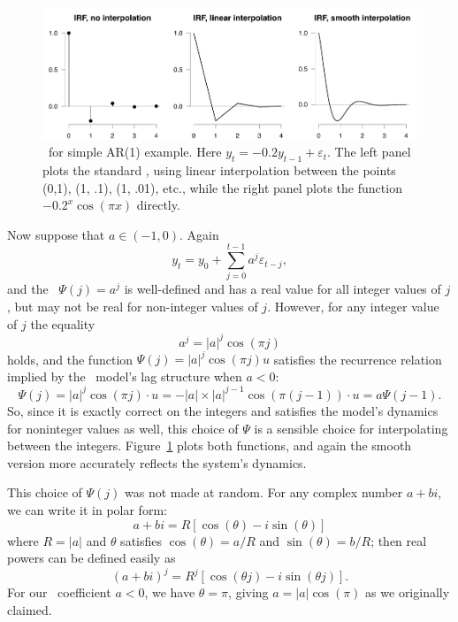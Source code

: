 \documentclass[12pt,fleqn]{article}
\newcommand{\vep}{\varepsilon}
\newcommand{\AR}{\allcaps{AR}}
\begin{document}
\begin{figure}[t]
  \centering
  \includegraphics{graphs/motivation2.pdf}
  \caption{\IRF\ for simple AR(1) example. Here $y_t = -0.2 y_{t-1} +
    \vep_t$. The left panel plots the standard \IRF, using linear
    interpolation between the points (0,1), (1, .1), (1, .01), etc.,
    while the right panel plots the function $- 0.2^x \cos(\pi x)$ directly.}
  \label{f0b}
\end{figure}

Now suppose that $a \in (-1, 0)$. Again
\begin{equation}
  \label{eq:4}
    y_t = y_0 + \sum_{j=0}^{t-1} a^j \vep_{t-j},
\end{equation}
and the \IRF\ $\Psi(j) = a^j$ is well-defined and has a real value for
all integer values of $j$, but may not be real for non-integer values
of $j$. However, for any integer value of $j$ the equality
\begin{equation}
  \label{eq:5}
  a^j = |a|^j \cos(\pi j)
\end{equation}
holds, and the function $\Psi(j) = |a|^j \cos(\pi j) u$ satisfies the
recurrence relation implied by the \AR\ model's lag structure when $a < 0$:
\begin{equation*}
  \Psi(j) = |a|^j \cos(\pi j) \cdot u = - |a| \times |a|^{j-1} \cos(\pi (j-1)) \cdot u = a \Psi(j-1).
\end{equation*}
So, since it is exactly correct on the integers and satisfies the
model's dynamics for noninteger values as well, this choice of $\Psi$
is a sensible choice for interpolating between the
integers. Figure~\ref{f0b} plots both functions, and again the smooth
version more accurately reflects the system's dynamics.

This choice of $\Psi(j)$ was not made at random. For any complex
number $a + bi$, we can write it in polar form:
\[
a + bi = R [\cos(\theta) - i \sin(\theta)]
\]
where $R = |a|$ and $\theta$ satisfies $\cos(\theta) = a/R$ and
$\sin(\theta) = b/R$; then real powers can be defined easily as
\[
(a + bi)^j = R^j [\cos(\theta j) - i \sin(\theta j)].
\]
For our \AR\ coefficient $a < 0$, we have $\theta = \pi$, giving
$a = |a| \cos(\pi)$ as we originally claimed.
\end{document}
